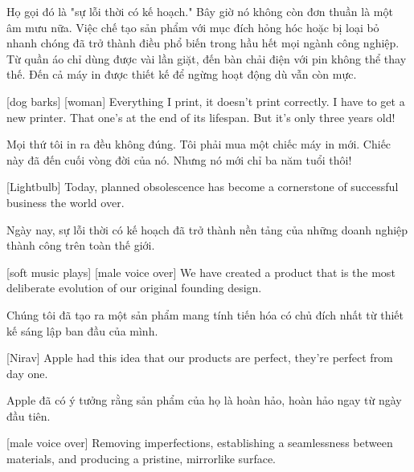 \documentclass[a4paper]{article}
\begin{document}
	\begin{vietnamese-v2}
		 Họ gọi đó là "sự lỗi thời có kế hoạch." 
		Bây giờ nó không còn đơn thuần là một âm mưu nữa. 
		Việc chế tạo sản phẩm với mục đích hỏng hóc hoặc bị loại bỏ nhanh chóng đã trở thành điều phổ biến trong hầu hết mọi ngành công nghiệp. 
		Từ quần áo chỉ dùng được vài lần giặt, đến bàn chải điện với pin không thể thay thế. 
		Đến cả máy in được thiết kế để ngừng hoạt động dù vẫn còn mực.
	\end{vietnamese-v2}
	
	[dog barks]
	[woman] Everything I print, it doesn't print correctly.
	I have to get a new printer. That one's at the end of its lifespan.
	But it's only three years old!
	
	\begin{vietnamese-v2}
		 Mọi thứ tôi in ra đều không đúng. 
		Tôi phải mua một chiếc máy in mới. Chiếc này đã đến cuối vòng đời của nó. 
		Nhưng nó mới chỉ ba năm tuổi thôi!
	\end{vietnamese-v2}
	
	[Lightbulb] Today, planned obsolescence has become a cornerstone of successful business the world over.
	
	\begin{vietnamese-v2}
		 Ngày nay, sự lỗi thời có kế hoạch đã trở thành nền tảng của những doanh nghiệp thành công trên toàn thế giới.
	\end{vietnamese-v2}
	
	[soft music plays]
	[male voice over] We have created a product that is the most deliberate evolution of our original founding design.
	
	\begin{vietnamese-v2}
		 Chúng tôi đã tạo ra một sản phẩm mang tính tiến hóa có chủ đích nhất từ thiết kế sáng lập ban đầu của mình.
	\end{vietnamese-v2}
	
	[Nirav] Apple had this idea that our products are perfect, they're perfect from day one.
	
	\begin{vietnamese-v2}
		[Nirav] Apple đã có ý tưởng rằng sản phẩm của họ là hoàn hảo, hoàn hảo ngay từ ngày đầu tiên.
	\end{vietnamese-v2}
	
	[male voice over] Removing imperfections, establishing a seamlessness between materials, and producing a pristine, mirrorlike surface.
\end{document}
